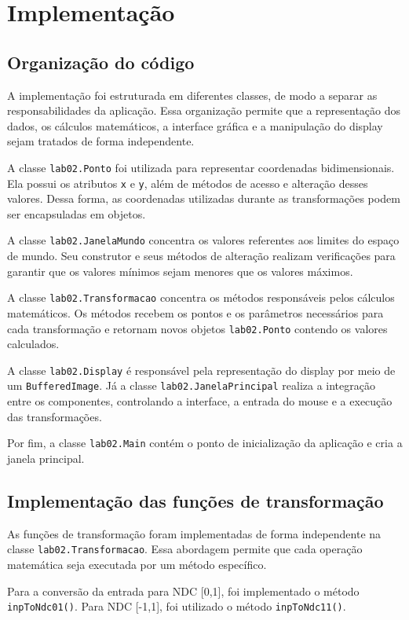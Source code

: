 \section{Implementação}

\subsection{Organização do código}
A implementação foi estruturada em diferentes classes, de modo a separar as responsabilidades da aplicação. Essa organização permite que a representação dos dados, os cálculos matemáticos, a interface gráfica e a manipulação do display sejam tratados de forma independente.

A classe \texttt{lab02.Ponto} foi utilizada para representar coordenadas bidimensionais. Ela possui os atributos \texttt{x} e \texttt{y}, além de métodos de acesso e alteração desses valores. Dessa forma, as coordenadas utilizadas durante as transformações podem ser encapsuladas em objetos.

A classe \texttt{lab02.JanelaMundo} concentra os valores referentes aos limites do espaço de mundo. Seu construtor e seus métodos de alteração realizam verificações para garantir que os valores mínimos sejam menores que os valores máximos.

A classe \texttt{lab02.Transformacao} concentra os métodos responsáveis pelos cálculos matemáticos. Os métodos recebem os pontos e os parâmetros necessários para cada transformação e retornam novos objetos \texttt{lab02.Ponto} contendo os valores calculados.

A classe \texttt{lab02.Display} é responsável pela representação do display por meio de um \texttt{BufferedImage}. Já a classe \texttt{lab02.JanelaPrincipal} realiza a integração entre os componentes, controlando a interface, a entrada do mouse e a execução das transformações.

Por fim, a classe \texttt{lab02.Main} contém o ponto de inicialização da aplicação e cria a janela principal.

\subsection{Implementação das funções de transformação}
As funções de transformação foram implementadas de forma independente na classe \texttt{lab02.Transformacao}. Essa abordagem permite que cada operação matemática seja executada por um método específico.

Para a conversão da entrada para NDC \mbox{[0,1]}, foi implementado o método \texttt{inpToNdc01()}. Para NDC \mbox{[-1,1]}, foi utilizado o método \texttt{inpToNdc11()}.

